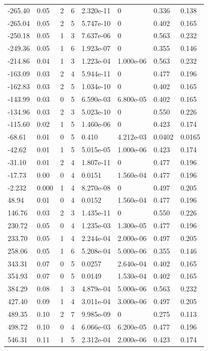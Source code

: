 \documentclass[preview]{standalone}
\begin{document}
{{\begin{tabular}{L{1.2cm}C{1.2cm} C{0.3cm}C{0.5cm} C{1.4cm}C{1.4cm} C{1.4cm}C{1.4cm}}
  -265.40  &  0.05  & 2     &  6 &  2.320e-11  & 0  & 0.336 &  0.138   \\ 
  -265.04  &  0.05  & 2     &  5 &  5.747e-10  & 0  & 0.402 &  0.165   \\ 
  -250.18  &  0.05  & 1     &  3 &  7.637e-06  & 0  & 0.563 &  0.232   \\ 
  -249.36  &  0.05  & 1     &  6 &  1.923e-07  & 0  & 0.355 &  0.146   \\ 
  -214.86  &  0.04  & 1     &  3 &  1.223e-04  & 1.000e-06  & 0.563 &  0.232   \\ 
  -163.09  &  0.03  & 2     &  4 &  5.944e-11  & 0  & 0.477 &  0.196   \\ 
  -162.83  &  0.03  & 2     &  5 &  1.034e-10  & 0  & 0.402 &  0.165   \\ 
  -143.99  &  0.03  & 0     &  5 &  6.590e-03  & 6.800e-05  & 0.402 &  0.165   \\ 
  -134.96  &  0.03  & 2     &  3 &  5.023e-10  & 0  & 0.550 &  0.226   \\ 
  -115.60  &  0.02  & 1     &  5 &  1.460e-06  & 0  & 0.423 &  0.174   \\ 
  -68.61  &  0.01  & 0     &  5 &  0.410  & 4.212e-03  & 0.0402 &  0.0165   \\ 
  -42.62  &  0.01  & 1     &  5 &  5.015e-05  & 1.000e-06  & 0.423 &  0.174   \\ 
  -31.10  &  0.01  & 2     &  4 &  1.807e-11  & 0  & 0.477 &  0.196   \\ 
  -17.73  &  0.00  & 0     &  4 &  0.0151  & 1.560e-04  & 0.477 &  0.196   \\ 
  -2.232  &  0.000  & 1     &  4 &  8.270e-08  & 0  & 0.497 &  0.205   \\ 
  48.94  &  0.01  & 0     &  4 &  0.0152  & 1.560e-04  & 0.477 &  0.196   \\ 
  146.76  &  0.03  & 2     &  3 &  1.435e-11  & 0  & 0.550 &  0.226   \\ 
  230.72  &  0.05  & 0     &  4 &  1.235e-03  & 1.300e-05  & 0.477 &  0.196   \\ 
  233.70  &  0.05  & 1     &  4 &  2.244e-04  & 2.000e-06  & 0.497 &  0.205   \\ 
  258.06  &  0.05  & 1     &  6 &  5.208e-04  & 5.000e-06  & 0.355 &  0.146   \\ 
  343.31  &  0.07  & 0     &  5 &  0.0257  & 2.640e-04  & 0.402 &  0.165   \\ 
  354.93  &  0.07  & 0     &  5 &  0.0149  & 1.530e-04  & 0.402 &  0.165   \\ 
  384.29  &  0.08  & 1     &  3 &  4.879e-04  & 5.000e-06  & 0.563 &  0.232   \\ 
  427.40  &  0.09  & 1     &  4 &  3.011e-04  & 3.000e-06  & 0.497 &  0.205   \\ 
  489.35  &  0.10  & 2     &  7 &  9.985e-09  & 0  & 0.275 &  0.113   \\ 
  498.72  &  0.10  & 0     &  4 &  6.066e-03  & 6.200e-05  & 0.477 &  0.196   \\ 
  546.31  &  0.11  & 1     &  5 &  2.312e-04  & 2.000e-06  & 0.423 &  0.174   \\ 
\hline 
\end{tabular} 

}}
\end{document}
